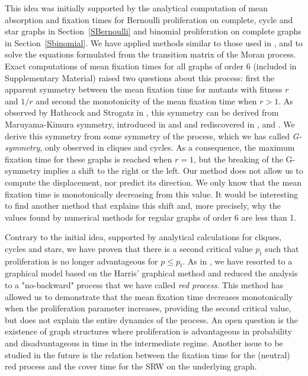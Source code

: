 \documentclass[a4paper,english,10pt]{amsart}
\theoremstyle{definition}
\numberwithin{equation}{section}
\begin{document}
This idea was initially supported by the analytical computation of mean absorp\-tion and fixation times for Bernoulli proliferation on complete, cycle and star graphs in Section~\ref{SBernoulli} and binomial proliferation on complete graphs in Section~\ref{Sbinomial}. We have applied methods similar to those used in \cite{Antal2006}, \cite{BHR} and \cite{H} to solve the equations formulated from the transition matrix of the Moran process. Exact computations of mean fixation times for all graphs of order 6 (included in Supplementary Material) raised two questions about this process: first the apparent symmetry between the mean fixation time for mutants with fitness $r$ and $1/r$ and second the monotonicity of the mean fixation time when $r > 1$. As observed by Hathcock and Strogatz in \cite{HathcockStrogatz}, this symmetry can be derived from Maruyama-Kimura symmetry, introduced in  \cite{MaruyamaTimes1974} and \cite{MaruyamaKimura} and  rediscovered in \cite{Antal2006}, \cite{Traulsen2015} and \cite{Taylor2006}. We derive this symmetry from some symmetry of the process, which we has called \emph{G-symmetry}, only observed in cliques and cycles. As a consequence, the maximum fixation time for these graphs is reached when $r=1$, but the breaking of the G-symmetry implies a shift to the right or the left. Our method does not allow us to compute the displacement, nor predict its direction. We only know that the mean fixation time is monotonically decreasing from this value. It would be interesting to find another method that explains this shift and, more precisely, why the values found by numerical methods for regular graphs of order 6 are less than 1.

Contrary to the initial idea, supported by analytical calculations for cliques, cycles and stars, we have proven that there is a second critical value $p_t$ such that proliferation is no longer advantageous for $p \leq p_t$. As in \cite{AlcaldeGuerberoffLozano2022}, we have resorted to a graphical model based on the Harris' graphical method \cite{Harris} and reduced the analysis to a "no-backward" process that we have called \emph{red process}. This method has allowed us to demonstrate that the mean fixation time decreases monotonically when the proliferation parameter increases, providing the second critical value, but does not explain 
the entire dynamics of the process. An open question is the existence of graph structures where proliferation is advantageous in probability and disadvantageous in time in the intermediate regime. Another issue to be studied in the future is the relation between the fixation time for the (neutral) red process and the cover time for the SRW on the underlying graph.
\end{document}
